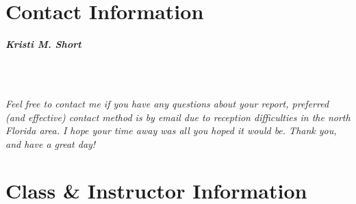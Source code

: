 \documentclass[10pt]{article}
\begin{document}
\section*{Contact Information}

\begin{framed}
\begin{center}
\large{\textit{\textbf{Kristi M. Short}}}
\end{center}

 \\
 \\
\begin{center}
\end{center}

\textit{Feel free to contact me if you have any questions about your report, preferred (and effective) contact method is by email due to reception difficulties in the north Florida area. I hope your time away was all you hoped it would be. Thank you, and have a great day!}

\end{framed}



\section*{Class \& Instructor Information}


\begin{framed}
 \\
 \\
 \\
 \\
\end{framed}

\vspace{0.2in}
\end{document}

